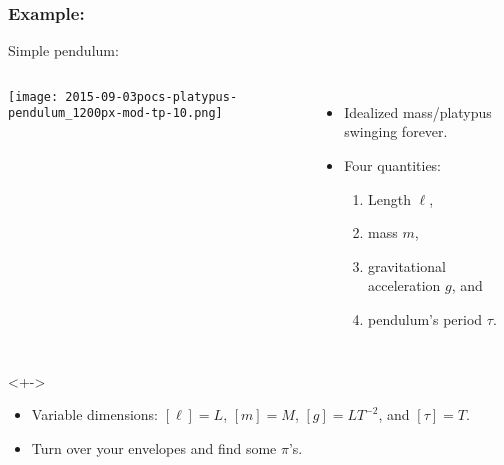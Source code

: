 \begin{frame}
  \frametitle{Example:}

  \begin{block}{Simple pendulum:}
    \begin{columns}
      \texttt{[image: 2015-09-03pocs-platypus-pendulum\_1200px-mod-tp-10.png]}
      \begin{itemize}
      \item<+->
        Idealized mass/platypus swinging forever.
      \item<+->
        Four quantities: 
        \begin{enumerate}
        \item<+-> 
          Length 
          $\ell$, 
        \item<+-> 
          mass $m$, 
        \item<+-> 
          gravitational
          acceleration $g$, 
          and 
        \item<+-> 
          pendulum's period $\tau$.
        \end{enumerate}
      \end{itemize}
    \end{columns}
  \end{block}

  \begin{block}<+->{}
    \begin{itemize}
    \item<+-> 
      Variable dimensions:
      $[\ell] = L$, 
      $[m] = M$, 
      $[g] = L T^{-2}$,
      and $[\tau] = T$.
    \item<+-> 
      Turn over your envelopes and find some $\pi$'s.
    \end{itemize}
  \end{block}


\end{frame}


